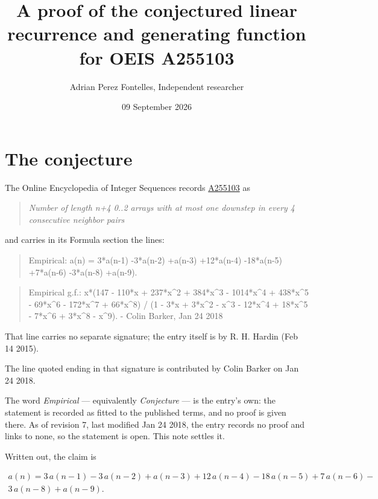 \documentclass[11pt]{article}
\title{A proof of the conjectured linear recurrence and generating function for OEIS A255103}
\author{Adrian Perez Fontelles, Independent researcher}
\date{09 September 2026}
\theoremstyle{definition}
\begin{document}
\maketitle
\section{The conjecture}

The Online Encyclopedia of Integer Sequences records \href{https://oeis.org/A255103}{A255103} as

\begin{quote}\itshape Number of length n+4 0..2 arrays with at most one downstep in every 4 consecutive neighbor pairs\end{quote}

and carries in its Formula section the lines:

\begin{quote}\ttfamily Empirical: a(n) = 3*a(n-1) -3*a(n-2) +a(n-3) +12*a(n-4) -18*a(n-5) +7*a(n-6) -3*a(n-8) +a(n-9).\end{quote}

\begin{quote}\ttfamily Empirical g.f.: x*(147 - 110*x + 237*x\textasciicircum{}2 + 384*x\textasciicircum{}3 - 1014*x\textasciicircum{}4 + 438*x\textasciicircum{}5 - 69*x\textasciicircum{}6 - 172*x\textasciicircum{}7 + 66*x\textasciicircum{}8) / (1 - 3*x + 3*x\textasciicircum{}2 - x\textasciicircum{}3 - 12*x\textasciicircum{}4 + 18*x\textasciicircum{}5 - 7*x\textasciicircum{}6 + 3*x\textasciicircum{}8 - x\textasciicircum{}9). - Colin Barker, Jan 24 2018\end{quote}

That line carries no separate signature; the entry itself is by R. H. Hardin (Feb 14 2015).

The line quoted ending in that signature is contributed by Colin Barker on Jan 24 2018.

The word {\itshape Empirical} --- equivalently {\itshape Conjecture} --- is the entry's own: the statement is recorded as fitted to the published terms, and no proof is given there. As of revision 7, last modified Jan 24 2018, the entry records no proof and links to none, so the statement is open. This note settles it.

Written out, the claim is

\begin{multline*} a(n) = 3\,a(n-1) - 3\,a(n-2) + a(n-3) + 12\,a(n-4) - 18\,a(n-5) + 7\,a(n-6) - \\ 3\,a(n-8) + a(n-9). \end{multline*}
\end{document}
